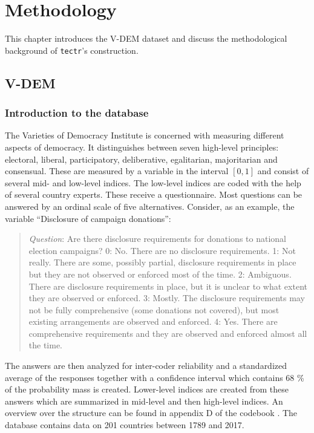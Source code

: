\documentclass[]{report}
\theoremstyle{definition}
\theoremstyle{definition}
\theoremstyle{definition}
\theoremstyle{remark}
\begin{document}
\chapter{Methodology}\label{methods}

This chapter introduces the V-DEM dataset and discuss the methodological
background of \texttt{tectr}'s construction.

\section{V-DEM}\label{v-dem}

\subsection{Introduction to the
database}\label{introduction-to-the-database}

The Varieties of Democracy Institute is concerned with measuring
different aspects of democracy. It distinguishes between seven
high-level principles: electoral, liberal, participatory, deliberative,
egalitarian, majoritarian and consensual. These are measured by a
variable in the interval \([0,1]\) and consist of several mid- and
low-level indices. The low-level indices are coded with the help of
several country experts. These receive a questionnaire. Most questions
can be answered by an ordinal scale of five alternatives. Consider, as
an example, the variable ``Disclosure of campaign donations'':

\begin{quote}
\emph{Question}: Are there disclosure requirements for donations to
national election campaigns? 0: No. There are no disclosure
requirements. 1: Not really. There are some, possibly partial,
disclosure requirements in place but they are not observed or enforced
most of the time. 2: Ambiguous. There are disclosure requirements in
place, but it is unclear to what extent they are observed or enforced.
3: Mostly. The disclosure requirements may not be fully comprehensive
(some donations not covered), but most existing arrangements are
observed and enforced. 4: Yes. There are comprehensive requirements and
they are observed and enforced almost all the time.
\end{quote}

The answers are then analyzed for inter-coder reliability and a
standardized average of the responses together with a confidence
interval which contains 68 \% of the probability mass is created.
Lower-level indices are created from these answers which are summarized
in mid-level and then high-level indices. An overview over the structure
can be found in appendix D of the codebook \citep{vdem-codebook2018}.
The database contains data on 201 countries between 1789 and 2017.
\citep[\citet{Pemstein2018}]{vdem2018}
\end{document}
